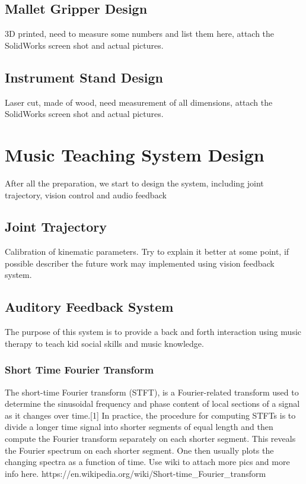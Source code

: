 \subsection{Mallet Gripper Design}
3D printed, need to measure some numbers and list them here, attach the SolidWorks
screen shot and actual pictures.

\subsection{Instrument Stand Design}
Laser cut, made of wood, need measurement of all dimensions, attach the SolidWorks
screen shot and actual pictures.

\section{Music Teaching System Design}
After all the preparation, we start to design the system, including joint trajectory, vision control and audio feedback

\subsection{Joint Trajectory}
Calibration of kinematic parameters. Try to explain it better at some point, if possible describer the future work may implemented using vision feedback system. 

\subsection{Auditory Feedback System}
The purpose of this system is to provide a back and forth interaction using music therapy to teach kid social skills and music knowledge.

\subsubsection{Short Time Fourier Transform}
The short-time Fourier transform (STFT), is a Fourier-related transform used to determine the sinusoidal frequency and phase content of local sections of a signal as it changes over time.[1] In practice, the procedure for computing STFTs is to divide a longer time signal into shorter segments of equal length and then compute the Fourier transform separately on each shorter segment. This reveals the Fourier spectrum on each shorter segment. One then usually plots the changing spectra as a function of time.
Use wiki to attach more pics and more info here.
https://en.wikipedia.org/wiki/Short-time_Fourier_transform

